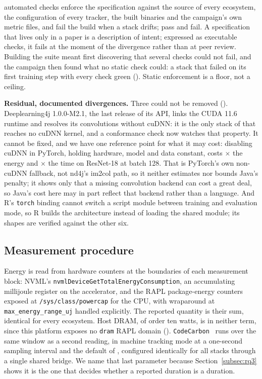 \vConformanceChecks{} automated checks enforce the specification against the
source of every ecosystem, the configuration of every tracker, the built
binaries and the campaign's own metric files, and fail the build when a stack
drifts; \vConformancePassing{} pass and \vConformanceFailing{} fail. A
specification that lives only in a paper is a description of intent; expressed
as executable checks, it fails at the moment of the divergence rather than at
peer review. Building the suite meant first discovering that several checks
could not fail, and the campaign then found what no static check could: a stack
that failed on its first training step with every check green
(). Static enforcement is a floor, not a ceiling.

\textbf{Residual, documented divergences.} Three could not be removed
(). Deeplearning4j 1.0.0-M2.1, the last release of its
API, links the CUDA 11.6 runtime and resolves its convolutions without cuDNN:
it is the only stack of \vEcosystems{} that reaches no cuDNN kernel, and a
conformance check now watches that property. It cannot be fixed, and we have
one reference point for what it may cost: disabling cuDNN in PyTorch, holding
hardware, model and data constant, costs \vCudnnOffEnergyRatio$\times$ the energy
and \vCudnnOffTimeRatio$\times$ the time on ResNet-18 at batch 128. That is
PyTorch's own non-cuDNN fallback, not nd4j's im2col path, so it neither
estimates nor bounds Java's penalty; it shows only that a missing convolution
backend can cost a great deal, so Java's cost here may in part reflect that
backend rather than a language. And R's
\texttt{torch} binding cannot switch a script module between training and
evaluation mode, so R builds the architecture instead of loading the shared
module; its shapes are verified against the other six.

\subsection{Measurement procedure}
\label{subsec:measurement}

Energy is read from hardware counters at the boundaries of each measurement
block: NVML's \texttt{nvmlDeviceGetTotalEnergyConsumption}, an accumulating
millijoule register on the accelerator, and the RAPL package-energy counters
exposed at \texttt{/sys/class/powercap} for the CPU, with wraparound at
\texttt{max\_energy\_range\_uj} handled explicitly. The reported quantity is
their sum, identical for every ecosystem. Host DRAM, of order ten watts, is in neither term, since this platform exposes
no \texttt{dram} RAPL domain (). \texttt{CodeCarbon}~\citep{codecarbon}
runs over the same window as a second reading, in machine tracking mode at a
one-second sampling interval and the default  of
\vMechApiCallInterval{}, configured identically for all \vEcosystems{} stacks
through a single shared bridge. We name that last parameter because
Section~\ref{subsec:rq3} shows it is the one that decides whether a reported
duration is a duration.

